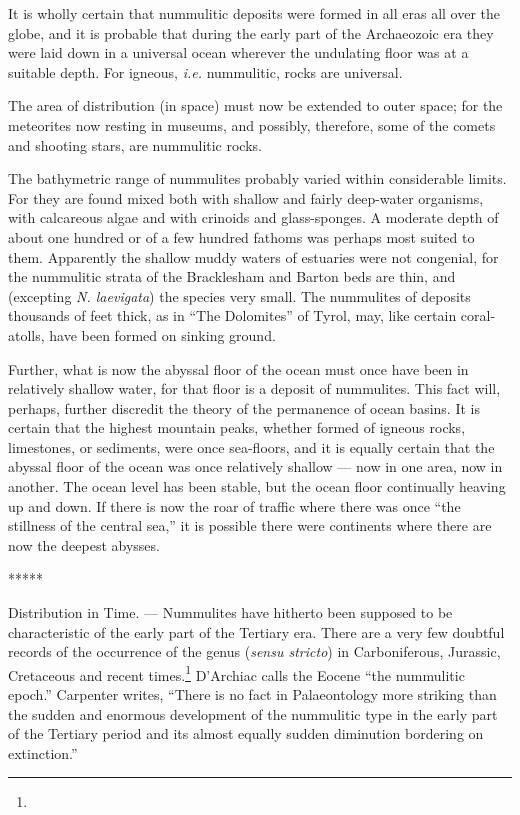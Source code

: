 \documentclass[a4paper, 12pt, oneside]{article}
\begin{document}
It is wholly certain that nummulitic deposits were formed in all eras all over the globe, and it is probable that during the early part of the Archaeozoic era they were laid down in a universal ocean wherever the undulating floor was at a suitable depth. For igneous, \emph{i.e.} nummulitic, rocks are universal.

The area of distribution (in space) must now be extended to outer space; for the meteorites now resting in museums, and possibly, therefore, some of the comets and shooting stars, are nummulitic rocks.

The bathymetric range of nummulites probably varied within considerable limits. For they are found mixed both with shallow and fairly deep-water organisms, with calcareous algae and with crinoids and glass-sponges. A moderate depth of about one hundred or of a few hundred fathoms was perhaps most suited to them. Apparently the shallow muddy waters of estuaries were not congenial, for the nummulitic strata of the Bracklesham and Barton beds are thin, and (excepting \emph{N. laevigata}) the species very small. The nummulites of deposits thousands of feet thick, as in ``The Dolomites'' of Tyrol, may, like certain coral-atolls, have been formed on sinking ground.

Further, what is now the abyssal floor of the ocean must once have been in relatively shallow water, for that floor is a deposit of nummulites. This fact will, perhaps, further discredit the theory of the permanence of ocean basins. It is certain that the highest mountain peaks, whether formed of igneous rocks, limestones, or sediments, were once sea-floors, and it is equally certain that the abyssal floor of the ocean was once relatively shallow --- now in one area, now in another. The ocean level has been stable, but the ocean floor continually heaving up and down. If there is now the roar of traffic where there was once ``the stillness of the central sea,'' it is possible there were continents where there are now the deepest abysses.

\centerline{*\hspace{15mm}*\hspace{15mm}*\hspace{15mm}*\hspace{15mm}*}
\bigskip

Distribution in Time. --- Nummulites have hitherto been supposed to be characteristic of the early part of the Tertiary era. There are a very few doubtful records of the occurrence of the genus (\emph{sensu stricto}) in Carboniferous, Jurassic, Cretaceous and recent times.\footnote{} D'Archiac calls the Eocene ``the nummulitic epoch.'' Carpenter writes, ``There is no fact in Palaeontology more striking than the sudden and enormous development of the nummulitic type in the early part of the Tertiary period and its almost equally sudden diminution bordering on extinction.''
\end{document}
